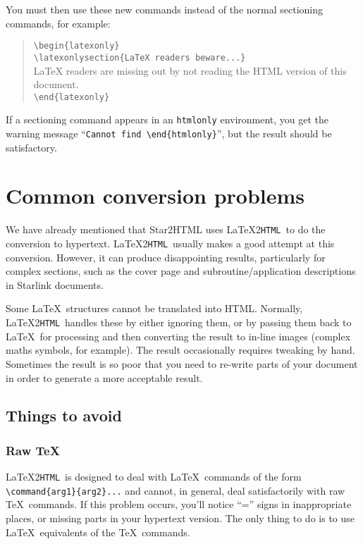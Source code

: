 \documentclass[twoside,11pt]{article}
\newcommand{\xlabel}[1]{}
\newcommand{\latextohtml}{\LaTeX2\texttt{HTML}}
\renewcommand{\_}{\texttt{\symbol{95}}}
\begin{document}
You must then use these new commands instead of the normal sectioning
commands, for example:

\begin{quote}
\verb!\begin!\verb!{latexonly}!\\
\verb!\latexonlysection{LaTeX readers beware...}!\\
LaTeX readers are missing out by not reading the HTML version of
this document.\\
\verb!\end!\verb!{latexonly}!
\end{quote}

If a sectioning command appears in an \texttt{htmlonly} environment, you get
the warning message ``\verb#Cannot find \end#\verb#{htmlonly}#'', but
the result should be satisfactory.

\section{\xlabel{common_conversion_problems}\label{common_problems}Common conversion problems}

We have already mentioned that Star2HTML uses \latextohtml\ to do the
conversion to hypertext.
\latextohtml\ usually makes a good attempt at this conversion.
However, it can produce disappointing results, particularly for complex
sections, such as the cover page and subroutine/application descriptions in
Starlink documents.

Some \LaTeX\ structures cannot be translated into HTML.
Normally, \latextohtml\ handles these by either ignoring them, or by passing
them back to \LaTeX\ for processing and then converting the result to
in-line images (complex maths symbols, for example).
The result occasionally requires tweaking by hand.
Sometimes the result is so poor that you need to re-write parts of your
document in order to generate a more acceptable result.

\subsection{\xlabel{things_to_avoid}Things to avoid}

\subsubsection{Raw \TeX}

\latextohtml\ is designed to deal with \LaTeX\ commands of the form
\verb#\command{arg1}{arg2}...# and cannot, in general, deal satisfactorily
with raw \TeX\ commands.
If this problem occurs, you'll notice ``='' signs in inappropriate places, or
missing parts in your hypertext version.
The only thing to do is to use \LaTeX\ equivalents of the \TeX\ commands.
\end{document}
